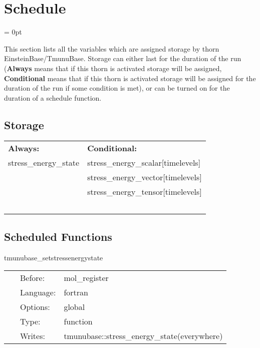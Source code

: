 
\section{Schedule} 


\parskip = 0pt


\noindent This section lists all the variables which are assigned storage by thorn EinsteinBase/TmunuBase.  Storage can either last for the duration of the run ({\bf Always} means that if this thorn is activated storage will be assigned, {\bf Conditional} means that if this thorn is activated storage will be assigned for the duration of the run if some condition is met), or can be turned on for the duration of a schedule function.


\subsection*{Storage}

\hspace{5mm}

 \begin{tabular*}{160mm}{ll} 

{\bf Always:}& {\bf Conditional:} \\ 
 stress\_energy\_state &  stress\_energy\_scalar[timelevels]\\ 
~ &  stress\_energy\_vector[timelevels]\\ 
~ &  stress\_energy\_tensor[timelevels]\\ 
~ & ~\\ 
\end{tabular*} 


\subsection*{Scheduled Functions}
\vspace{5mm}


\hspace{5mm} tmunubase\_setstressenergystate 

\hspace{5mm}{\it set the stress\_energy\_state variable } 


\hspace{5mm}

 \begin{tabular*}{160mm}{cll} 
~ & Before:  & mol\_register \\ 
~ & Language:  & fortran \\ 
~ & Options:  & global \\ 
~ & Type:  & function \\ 
~ & Writes:  & tmunubase::stress\_energy\_state(everywhere) \\ 
\end{tabular*} 


